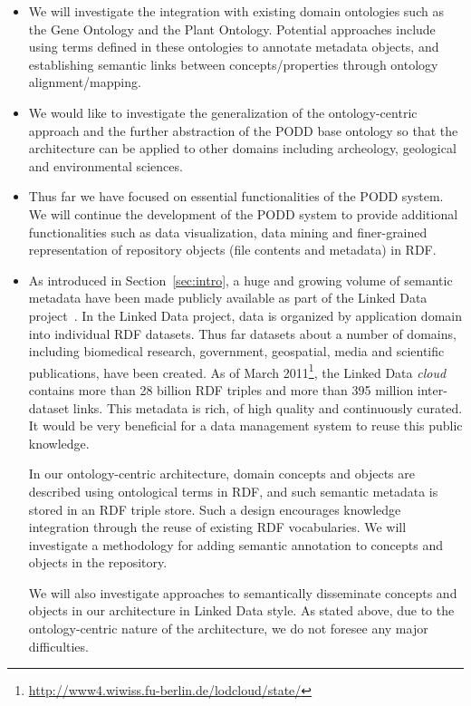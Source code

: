 \documentclass[preprint,12pt]{elsarticle}
\begin{document}
\begin{itemize}
\item We will investigate the integration with existing domain ontologies such as the Gene Ontology and the Plant Ontology. Potential approaches include using terms defined in these ontologies to annotate metadata objects, and establishing semantic links between concepts/properties through ontology alignment/mapping.

\item We would like to investigate the generalization of the ontology-centric approach and the further abstraction of the PODD base ontology so that the architecture can be applied to other domains including archeology, geological and environmental sciences. 

\item Thus far we have focused on essential functionalities of the PODD system. We will continue the development of the PODD system to provide additional functionalities such as data visualization, data mining and finer-grained representation of repository objects (file contents and metadata) in RDF. 

\item As introduced in Section~\ref{sec:intro}, a huge and growing volume of semantic metadata have been made publicly available as part of the Linked Data project~\cite{citeulike:5008761}. In the Linked Data project, data is organized by application domain into individual RDF datasets. Thus far datasets about a number of domains, including biomedical research, government, geospatial, media and scientific publications, have been created. As of March 2011\footnote{\url{http://www4.wiwiss.fu-berlin.de/lodcloud/state/}}, the Linked Data \emph{cloud} contains more than 28 billion RDF triples and more than 395 million inter-dataset links. This metadata is rich, of high quality and continuously curated. It would be very beneficial for a data management system to reuse this public knowledge.

In our ontology-centric architecture, domain concepts and objects are described using ontological terms in RDF, and such semantic metadata is stored in an RDF triple store. Such a design encourages knowledge integration through the reuse of existing RDF vocabularies. We will investigate a methodology for adding semantic annotation to concepts and objects in the repository. 

We will also investigate approaches to semantically disseminate concepts and objects in our architecture in Linked Data style. As stated above, due to the ontology-centric nature of the architecture, we do not foresee any major difficulties.


\end{itemize}
\end{document}
